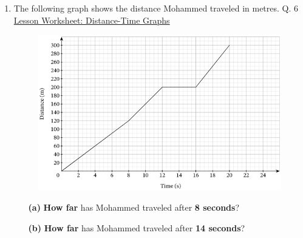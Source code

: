 \documentclass[A4,12pt]{article}
\begin{document}
\begin{enumerate}[label=\bfseries (\arabic*)]
\item The following graph shows the distance Mohammed traveled in metres. \cite{Nagwa} Q. 6 \href{https://www.nagwa.com/en/worksheets/932192593730/}{Lesson Worksheet: Distance-Time Graphs}
%
\begin{figure}[H]
    \centering
    \includegraphics[scale=0.7]{Nagwa_Q6_kin2.png}
\end{figure}
%
\begin{itemize}
    \item[\bf (a)] \textbf{How far} has Mohammed traveled after \textbf{8 seconds}?
    \item[\bf (b)] \textbf{How far} has Mohammed traveled after \textbf{14 seconds}?
\end{itemize}















\end{enumerate}
\end{document}
